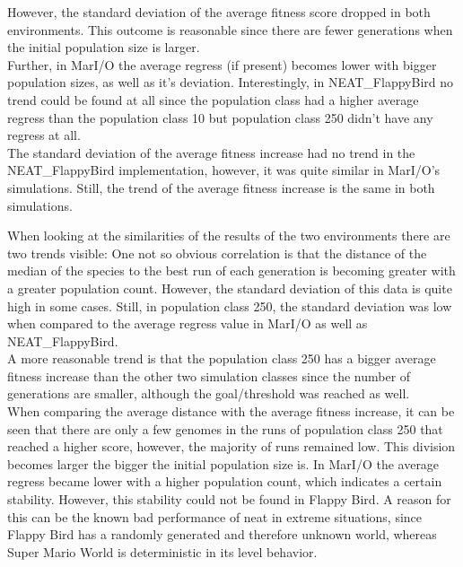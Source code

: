 	However, the standard deviation of the average fitness score dropped in both environments. This outcome is reasonable since there are fewer generations when the initial population size is larger.\\
	Further, in MarI/O the average regress (if present) becomes lower with bigger population sizes, as well as it's deviation. Interestingly, in NEAT\_FlappyBird no trend could be found at all since the population class had a higher average regress than the population class 10 but population class 250 didn't have any regress at all.\\
	The standard deviation of the average fitness increase had no trend in the NEAT\_FlappyBird implementation, however, it was quite similar in MarI/O's simulations. Still, the trend of the average fitness increase is the same in both simulations.
	
	When looking at the similarities of the results of the two environments there are two trends visible:
	One not so obvious correlation is that the distance of the median of the species to the best run of each generation is becoming greater with a greater population count. However, the standard deviation of this data is quite high in some cases. Still, in population class 250, the standard deviation was low when compared to the average regress value in MarI/O as well as NEAT\_FlappyBird.\\
	A more reasonable trend is that the population class 250 has a bigger average fitness increase than the other two simulation classes since the number of generations are smaller, although the goal/threshold was reached as well.\\
	When comparing the average distance with the average fitness increase, it can be seen that there are only a few genomes in the runs of population class 250 that reached a higher score, however, the majority of runs remained low. This division becomes larger the bigger the initial population size is. In MarI/O the average regress became lower with a higher population count, which indicates a certain stability. However, this stability could not be found in Flappy Bird. A reason for this can be the known bad performance of neat in extreme situations, since Flappy Bird has a randomly generated and therefore unknown world, whereas Super Mario World is deterministic in its level behavior\cite{kohl_integrated_2011}.
